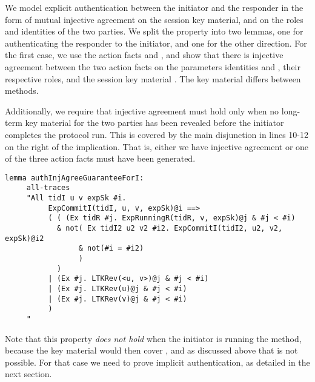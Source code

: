 {
We model explicit authentication between the initiator and the
responder in the form of mutual injective agreement on the session key material,
and on the roles and identities of the two parties.
%
We split the property into two lemmas, one for authenticating the responder to the
initiator, and one for the other direction.
%
For the first case, we use the action facts  and
, and show that there is injective agreement
between the two action facts on the parameters identities  and ,
their respective roles,  and the session key material .
%
The key material differs between \mEdhoc{} methods.
%

Additionally, we require that injective agreement must hold only when
no long-term key material for the two parties has been revealed before
the initiator completes the protocol run.
%
This is covered by the main disjunction in lines 10-12 on the right of
the implication.
%
That is, either we have injective agreement or one of
the three  action facts must have been generated.
%


\begin{lstlisting}
lemma authInjAgreeGuaranteeForI:
     all-traces
     "All tidI u v expSk #i.
          ExpCommitI(tidI, u, v, expSk)@i ==>
          ( ( (Ex tidR #j. ExpRunningR(tidR, v, expSk)@j & #j < #i)
            & not( Ex tidI2 u2 v2 #i2. ExpCommitI(tidI2, u2, v2, expSk)@i2
                 & not(#i = #i2)
                 )
            )
          | (Ex #j. LTKRev(<u, v>)@j & #j < #i)
          | (Ex #j. LTKRev(u)@j & #j < #i)
          | (Ex #j. LTKRev(v)@j & #j < #i)
          )
     "
\end{lstlisting}

Note that this property \emph{does not hold} when the initiator is
running the \mStat{} method, because the key material would then cover \mGiy{},
and as discussed above that is not possible.
%
For that case we need to prove implicit authentication, as detailed in
the next section.

}
